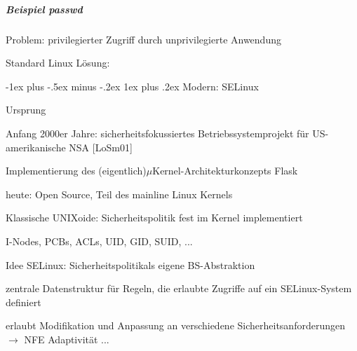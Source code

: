 \documentclass[a4paper]{article}
\makeatletter
\renewcommand{\subsubsection}{\@startsection{subsubsection}{3}{0mm}%
 {-1ex plus -.5ex minus -.2ex}%
 {1ex plus .2ex}%
 {\normalfont\small\bfseries}}
\makeatother
\begin{document}
\begin{multicols}{3}
    \subparagraph{Beispiel passwd}

    \begin{itemize*}
        \item
        Problem: privilegierter Zugriff durch unprivilegierte Anwendung
        \item
        Standard Linux Lösung:
    \end{itemize*}

    \subsubsection{Modern: SELinux}

    \begin{itemize*}
        \item
        Ursprung
        \begin{itemize*}
            \item Anfang 2000er Jahre: sicherheitsfokussiertes Betriebssystemprojekt für US-amerikanische NSA {[}LoSm01{]}
            \item Implementierung des (eigentlich)$\mu$Kernel-Architekturkonzepts Flask
            \item heute: Open Source, Teil des mainline Linux Kernels
        \end{itemize*}
        \item
        Klassische UNIXoide: Sicherheitspolitik fest im Kernel implementiert
        \begin{itemize*}
            \item I-Nodes, PCBs, ACLs, UID, GID, SUID, ...
        \end{itemize*}
        \item
        Idee SELinux: Sicherheitspolitikals eigene BS-Abstraktion
        \begin{itemize*}
            \item zentrale Datenstruktur für Regeln, die erlaubte Zugriffe auf ein SELinux-System definiert
            \item erlaubt Modifikation und Anpassung an verschiedene Sicherheitsanforderungen $\rightarrow$ NFE Adaptivität ...
        \end{itemize*}
    \end{itemize*}



\end{multicols}
\end{document}
